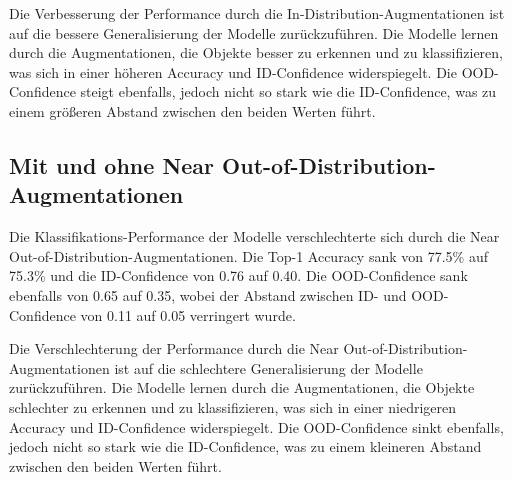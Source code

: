 Die Verbesserung der Performance durch die In-Distribution-Augmentationen ist auf die bessere Generalisierung der Modelle zurückzuführen. Die Modelle lernen durch die Augmentationen, die Objekte besser zu erkennen und zu klassifizieren, was sich in einer höheren Accuracy und ID-Confidence widerspiegelt. Die OOD-Confidence steigt ebenfalls, jedoch nicht so stark wie die ID-Confidence, was zu einem größeren Abstand zwischen den beiden Werten führt.

\subsection{Mit und ohne Near Out-of-Distribution-Augmentationen} \label{sec:results-comparison-ood}

Die Klassifikations-Performance der Modelle verschlechterte sich durch die Near Out-of-Distribution-Augmentationen. Die Top-1 Accuracy sank von 77.5\% auf 75.3\% und die ID-Confidence von 0.76 auf 0.40. Die OOD-Confidence sank ebenfalls von 0.65 auf 0.35, wobei der Abstand zwischen ID- und OOD-Confidence von 0.11 auf 0.05 verringert wurde.

Die Verschlechterung der Performance durch die Near Out-of-Distribution-Augmentationen ist auf die schlechtere Generalisierung der Modelle zurückzuführen. Die Modelle lernen durch die Augmentationen, die Objekte schlechter zu erkennen und zu klassifizieren, was sich in einer niedrigeren Accuracy und ID-Confidence widerspiegelt. Die OOD-Confidence sinkt ebenfalls, jedoch nicht so stark wie die ID-Confidence, was zu einem kleineren Abstand zwischen den beiden Werten führt.